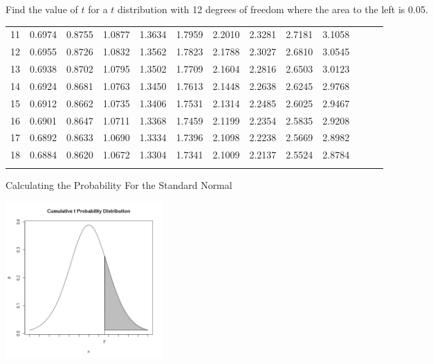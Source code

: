 \begin{frame}{\small Find the value of $t$ for a $t$ distribution with
    12 degrees of freedom where the area to the left is 0.05.}
{\begin{tabular}{l|llll>{\columncolor{light-blue}}llllllll}
 11 & 0.6974 & 0.8755 & 1.0877 & 1.3634 & 1.7959 & 2.2010 & 2.3281 & 2.7181 & 3.1058  \\[5pt] \arrayrulecolor{light-gray}\hline\arrayrulecolor{black}  
\rowcolor{light-red} 12 & 0.6955 & 0.8726 & 1.0832 & 1.3562 & 1.7823 & 2.1788 & 2.3027 & 2.6810 & 3.0545  \\[5pt] \arrayrulecolor{light-gray}\hline\arrayrulecolor{black}  
 13 & 0.6938 & 0.8702 & 1.0795 & 1.3502 & 1.7709 & 2.1604 & 2.2816 & 2.6503 & 3.0123  \\[5pt] \arrayrulecolor{light-gray}\hline\arrayrulecolor{black}  
 14 & 0.6924 & 0.8681 & 1.0763 & 1.3450 & 1.7613 & 2.1448 & 2.2638 & 2.6245 & 2.9768  \\[12pt] \arrayrulecolor{light-gray}\hline\arrayrulecolor{black}  
 15 & 0.6912 & 0.8662 & 1.0735 & 1.3406 & 1.7531 & 2.1314 & 2.2485 & 2.6025 & 2.9467  \\[5pt] \arrayrulecolor{light-gray}\hline\arrayrulecolor{black}  
 16 & 0.6901 & 0.8647 & 1.0711 & 1.3368 & 1.7459 & 2.1199 & 2.2354 & 2.5835 & 2.9208  \\[5pt] \arrayrulecolor{light-gray}\hline\arrayrulecolor{black}  
 17 & 0.6892 & 0.8633 & 1.0690 & 1.3334 & 1.7396 & 2.1098 & 2.2238 & 2.5669 & 2.8982  \\[5pt] \arrayrulecolor{light-gray}\hline\arrayrulecolor{black}  
 18 & 0.6884 & 0.8620 & 1.0672 & 1.3304 & 1.7341 & 2.1009 & 2.2137 & 2.5524 & 2.8784  \\[5pt] \arrayrulecolor{light-gray}\hline\arrayrulecolor{black}  
\end{tabular}

}

\end{frame}

\begin{frame}{Calculating the Probability For the Standard Normal}

  \includegraphics[width=6cm]{img/tcummulativeDist}
  
\end{frame}


